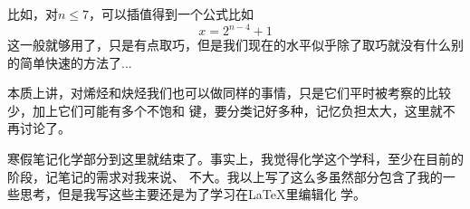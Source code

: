 比如，对$n \leq 7$，可以插值得到一个公式比如
\begin{equation}
x = 2^{n-4} + 1
\end{equation}
这一般就够用了，只是有点取巧，但是我们现在的水平似乎除了取巧就没有什么别的简单快速的方法了...

本质上讲，对烯烃和炔烃我们也可以做同样的事情，只是它们平时被考察的比较少，加上它们可能有多个不饱和
键，要分类记好多种，记忆负担太大，这里就不再讨论了。

寒假笔记化学部分到这里就结束了。事实上，我觉得化学这个学科，至少在目前的阶段，记笔记的需求对我来说、
不大。我以上写了这么多虽然部分包含了我的一些思考，但是我写这些主要还是为了学习在\LaTeX 里编辑化
学。